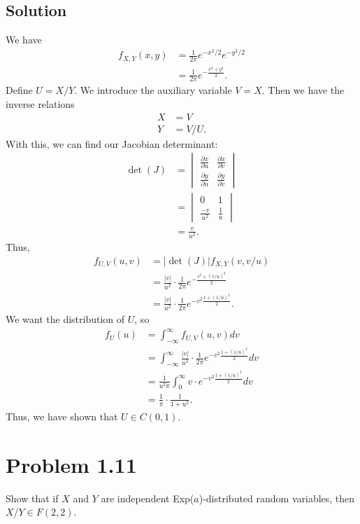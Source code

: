 \documentclass[10pt,a4paper]{article}
\theoremstyle{theorem}
\theoremstyle{definition}
\begin{document}
\subsection*{Solution}
We have
\begin{align*}
f_{X, Y} (x, y) &= \frac{1}{2 \pi} e^{-x^2 / 2} e^{-y^2 / 2}\\
&= \frac{1}{2 \pi} e^{-\frac{x^2 + y^2}{2}}.
\end{align*}
Define $U = X/Y$. We introduce the auxiliary variable $V = X$. Then we have the inverse relations
\begin{align*}
X &= V\\
Y &= V/U.
\end{align*}
With this, we can find our Jacobian determinant:
\begin{align*}
\det(J) &= 
\begin{vmatrix}
\frac{\partial x}{\partial u} & \frac{\partial x}{\partial v}\\
\frac{\partial y}{\partial u} & \frac{\partial y}{\partial v}
\end{vmatrix}\\
&= \begin{vmatrix}
0 & 1\\
\frac{-v}{u^2} & \frac{1}{u}
\end{vmatrix}\\
&= \frac{v}{u^2}.
\end{align*}
Thus,
\begin{align*}
f_{U, V} (u, v) &= |\det(J)| f_{X, Y} (v, v/u)\\
&= \frac{|v|}{u^2} \cdot  \frac{1}{2 \pi} e^{-\frac{v^2 + (v/u)^2}{2}}\\
&= \frac{|v|}{u^2} \cdot  \frac{1}{2 \pi} e^{-v^2 \frac{1 + (1/u)^2}{2}}.
\end{align*}
We want the distribution of $U$, so
\begin{align*}
f_U(u) &= \int_{- \infty}^\infty f_{U, V} (u, v) dv\\
&= \int_{- \infty}^\infty \frac{|v|}{u^2} \cdot  \frac{1}{2 \pi} e^{-v^2 \frac{1 + (1/u)^2}{2}} dv\\
&=  \frac{1}{u^2 \pi} \int_{0}^\infty v\cdot  e^{-v^2 \frac{1 + (1/u)^2}{2}} dv\\
&= \frac{1}{\pi} \cdot \frac{1}{1 + u^2}.
\end{align*}
Thus, we have shown that $U \in C(0, 1)$.

\section*{Problem 1.11}
Show that if $X$ and $Y$ are independent Exp($a$)-distributed random variables, then $X/Y \in F(2, 2)$.
\end{document}
